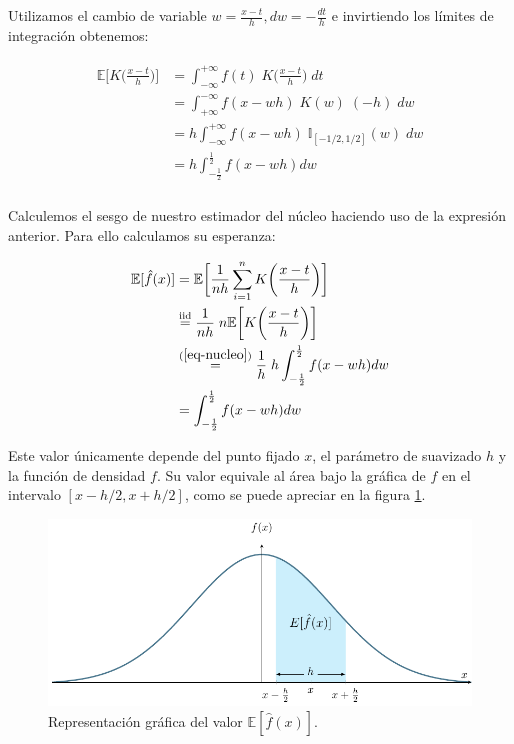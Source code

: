 \documentclass[a4paper]{article}
\newcommand{\E}{\mathbb{E}}
\newcommand{\I}{\mathbb{I}}
\begin{document}
Utilizamos el cambio de variable $w = \frac{x-t}{h}, dw = -\frac{dt}{h}$ e invirtiendo los límites de integración obtenemos:

\begin{align}
	\label{eq-nucleo}
	\begin{split}
		\E \bigg[ K\bigg(\frac{x - t}{h}\bigg) \bigg] & = \int_{-\infty}^{+\infty} f(t) \; K\bigg(\frac{x - t}{h}\bigg) \; dt \\
		& = \int_{+\infty}^{-\infty} f(x - wh) \; K(w) \; (-h) \; dw \\
		& = h \int_{-\infty}^{+\infty} f(x - wh) \; \I_{[-1/2,1/2]}(w) \; dw \\
		& = h \int_{-\frac{1}{2}}^{\frac{1}{2}} f(x - wh) dw \\
	\end{split}
\end{align}

Calculemos el sesgo de nuestro estimador del núcleo haciendo uso de la expresión anterior. Para ello calculamos su esperanza:

\begin{align*}
	\E [ \hat f(x)] & = \E \bigg[ \frac{1}{nh} \sum_{i=1}^n K\bigg(\frac{x - t}{h}\bigg) \bigg] \\
	& \stackrel{\text{iid}}{=} \frac{1}{nh} \; n \E \bigg[ K\bigg(\frac{x - t}{h}\bigg) \bigg] \\
	& \stackrel{(\ref{eq-nucleo})}{=} \frac{1}{h} \; h \int_{-\frac{1}{2}}^{\frac{1}{2}} f(x - wh) dw \\
	& = \int_{-\frac{1}{2}}^{\frac{1}{2}} f(x - wh) dw \\
\end{align*}

Este valor únicamente depende del punto fijado $x$, el parámetro de suavizado $h$ y la función de densidad $f$. Su valor equivale al área bajo la gráfica de $f$ en el intervalo $[x - h/2, x + h/2]$, como se puede apreciar en la figura \ref{fig-sesgo}. \\

\begin{figure}[H]
	\centering
	\includegraphics[scale=0.9]{Ejer6/sesgo}
	\caption{Representación gráfica del valor $\E [\hat f(x)]$.}
	\label{fig-sesgo}
\end{figure}
\end{document}
